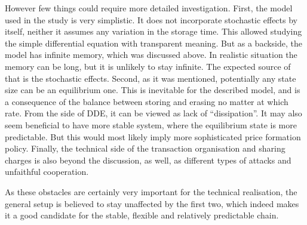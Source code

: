 \documentclass[preprint]{revtex4-1}
\begin{document}
However few things could require more detailed investigation. First, the model
used in the study is very simplistic. It does not incorporate stochastic effects
by itself, neither it assumes any variation in the storage time. This allowed
studying the simple differential equation with transparent meaning. But as a
backside, the model has infinite memory, which was discussed above. In realistic
situation the memory can be long, but it is unlikely to stay infinite. The
expected source of that is the stochastic effects. Second, as it was mentioned,
potentially any state size can be an equilibrium one. This is inevitable for the
described model, and is a consequence of the balance between storing and erasing
no matter at which rate. From the side of DDE, it can be viewed as lack of
``dissipation''. It may also seem beneficial to have more stable system, where
the equilibrium state is more predictable. But this would most likely imply more
sophisticated price formation policy. Finally, the technical side of the
transaction organisation and sharing charges is also beyond the discussion, as
well, as different types of attacks and unfaithful cooperation.

As these obstacles are certainly very important for the technical realisation,
the general setup is believed to stay unaffected by the first two, which indeed
makes it a good candidate for the stable, flexible and relatively predictable
chain.


\end{document}
